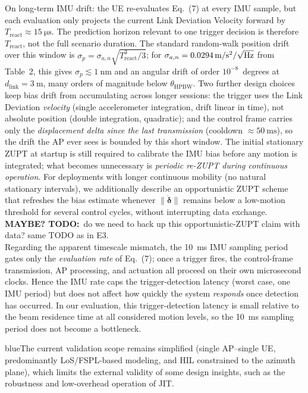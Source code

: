 \documentclass{article}
\newcommand{\blue}[1]{\begin{color}{blue}#1\end{color}}
\newcommand{\todo}[1]{\textcolor{todopurple}{\textbf{MAYBE? TODO:}~#1}}
\begin{document}
\noindent On long-term IMU drift: the UE re-evaluates Eq.~(7) at every IMU sample, but each evaluation only projects the current Link Deviation Velocity forward by $T_{\text{react}} \approx \SI{15}{\micro\second}$. The prediction horizon relevant to one trigger decision is therefore $T_{\text{react}}$, not the full scenario duration. The standard random-walk position drift over this window is $\sigma_p = \sigma_{a,n}\sqrt{T_{\text{react}}^{3}/3}$; for $\sigma_{a,n} = \SI{0.0294}{\meter\per\second\squared\per\sqrt{\hertz}}$ from Table~2, this gives $\sigma_p \lesssim \SI{1}{\nano\meter}$ and an angular drift of order $10^{-8}$~degrees at $d_{\text{link}} = \SI{3}{\meter}$, many orders of magnitude below $\theta_{\text{HPBW}}$. Two further design choices keep bias drift from accumulating across longer sessions: the trigger uses the Link Deviation \emph{velocity} (single accelerometer integration, drift linear in time), not absolute position (double integration, quadratic); and the control frame carries only the \emph{displacement delta since the last transmission} (cooldown $\approx \SI{50}{\milli\second}$), so the drift the AP ever sees is bounded by this short window. The initial stationary ZUPT at startup is still required to calibrate the IMU bias before any motion is integrated; what becomes unnecessary is \emph{periodic re-ZUPT during continuous operation}. For deployments with longer continuous mobility (no natural stationary intervals), we additionally describe an opportunistic ZUPT scheme that refreshes the bias estimate whenever $\|\dot{\boldsymbol\delta}\|$ remains below a low-motion threshold for several control cycles, without interrupting data exchange. \todo{do we need to back up this opportunistic-ZUPT claim with data? same TODO as in E3.}\\

\noindent Regarding the apparent timescale mismatch, the \SI{10}{\milli\second} IMU sampling period gates only the \emph{evaluation rate} of Eq.~(7); once a trigger fires, the control-frame transmission, AP processing, and actuation all proceed on their own microsecond clocks. Hence the IMU rate caps the trigger-detection latency (worst case, one IMU period) but does not affect how quickly the system \emph{responds} once detection has occurred. In our evaluation, this trigger-detection latency is small relative to the beam residence time at all considered motion levels, so the \SI{10}{\milli\second} sampling period does not become a bottleneck.

\begin{tcbremark}
{\selectfont
\blue{The current validation scope remains simplified (single AP--single UE, predominantly LoS/FSPL-based modeling, and HIL constrained to the azimuth plane), which limits the external validity of some design insights, such as the robustness and low-overhead operation of JIT.}
}
\end{tcbremark}
\end{document}
